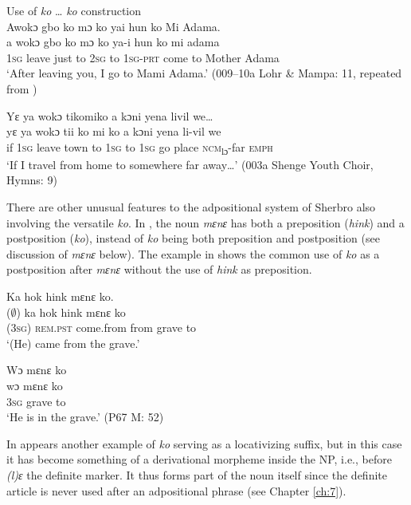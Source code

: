 \ea %
\label{ex:80}
Use of \textit{ko} … \textit{ko} construction\\

\ea \label{ex:80a} Awokɔ gbo ko mɔ ko yai hun ko Mi Adama.\\
\gll a    wokɔ    gbo  ko    mɔ  ko    ya-i    hun    ko    mi        adama\\
  1\textsc{sg}  leave    just  to    \textsc{2sg}  to    \textsc{1sg-prt}  come    to    Mother    Adama\\
  \glt ‘After leaving you, I go to Mami Adama.' (009--10a Lohr \& Mampa: 11, repeated from )

\ex \label{ex:80b} Yɛ ya wokɔ tikomiko a kɔni yena livil we…\\
\gll yɛ    ya    wokɔ    tii      ko    mi    ko    a    kɔni  yena    li-vil      we\\
  if    \textsc{1sg}  leave    town    to    \textsc{1sg}  to    \textsc{1sg}  go    place    \textsc{ncm}\textsubscript{lɔ}{}-far  \textsc{emph}\\
\glt ‘If I travel from home to somewhere far away…' (003a Shenge Youth Choir, Hymns: 9)
\z
\z

There are other unusual features to the adpositional system of Sherbro also involving the versatile \textit{ko}. In , the noun \textit{mɛnɛ} has both a preposition (\textit{hink}) and a postposition (\textit{ko}), instead of \textit{ko} being both preposition and postposition (see discussion of \textit{mɛnɛ} below). The example in  shows the common use of \textit{ko} as a postposition after \textit{mɛnɛ} without the use of \textit{hink} as preposition.

\ea%
\label{ex:81}
\ea \label{ex:81a} Ka hok hink mɛnɛ ko.\\
\gll ($\emptyset$) ka      hok      hink  mɛnɛ    ko\\
\textsc{(3sg)} \textsc{rem.pst}  come.from  from  grave to\\
\glt ‘(He) came from the grave.'


\ex \label{ex:81b} Wɔ mɛnɛ ko\\
\gll wɔ    mɛnɛ    ko\\
\textsc{3sg}  grave    to\\
\glt ‘He is in the grave.' (P67 M: 52)
\z
\z

In  appears another example of \textit{ko} serving as a locativizing suffix, but in this case it has become something of a derivational morpheme inside the NP, i.e., before \textit{(l)ɛ} the definite marker. It thus forms part of the noun itself since the definite article is never used after an adpositional phrase (see Chapter \ref{ch:7}).


